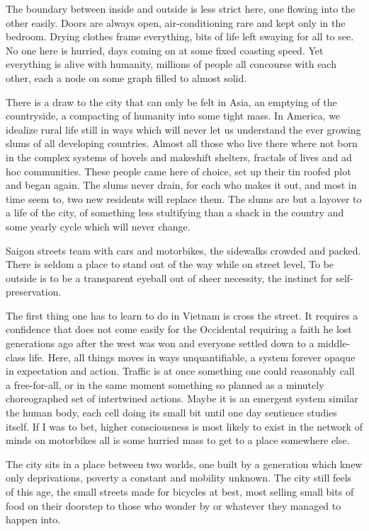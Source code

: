 \documentclass[ebook, 10pt, openright, onecolumn]{memoir}
\begin{document}
The boundary between inside and outside is less strict here, one flowing into
the other easily.  Doors are always open, air-conditioning rare and kept only in
the bedroom.  Drying clothes frame everything, bits of life left swaying for all
to see.  No one here is hurried, days coming on at some fixed coasting
speed. Yet everything is alive with humanity, millions of people all 
concourse with each other, each a node on some graph filled to almost solid.

There is a draw to the city that can only be felt in Asia, an emptying of the
countryside, a compacting of humanity into some tight mass.  In America, we
idealize rural life still in ways which will never let us understand the ever
growing slums of all developing countries.  Almost all those who live there
where not born in the complex systems of hovels and makeshift shelters, 
fractals of lives and ad hoc communities.  These people came here of choice, set
up their tin roofed plot and began again.  The slums never drain, for each who
makes it out, and most in time seem to, two new residents will replace them.
The slums are but a layover to a life of the city, of something less stultifying
than a shack in the country and some yearly cycle which will never change.

Saigon streets team with cars and motorbikes, the sidewalks crowded and packed.
There is seldom a place to stand out of the way while on street level, To be
outside is to be a transparent eyeball out of sheer necessity, the instinct for
self-preservation.

The first thing one has to learn to do in Vietnam is cross the street.  It
requires a confidence that does not come easily for the Occidental requiring a
faith he lost generations ago after the west was won and everyone settled down
to a middle-class life.  Here, all things moves in ways unquantifiable, a system
forever opaque in expectation and action.  Traffic is at once something one
could reasonably call a free-for-all, or in the same moment something so planned
as a minutely choreographed set of intertwined actions.  Maybe it is an emergent
system similar the human body, each cell doing its small bit until one day
sentience studies itself.  If I was to bet, higher consciousness is most likely
to exist in the network of minds on motorbikes all is some hurried mass to get
to a place somewhere else.

The city sits in a place between two worlds, one built by a generation which
knew only deprivations, poverty a constant and mobility unknown.  The city still
feels of this age, the small streets made for bicycles at best, most selling
small bits of food on their doorstep to those who wonder by or whatever they
managed to happen into.
\end{document}
